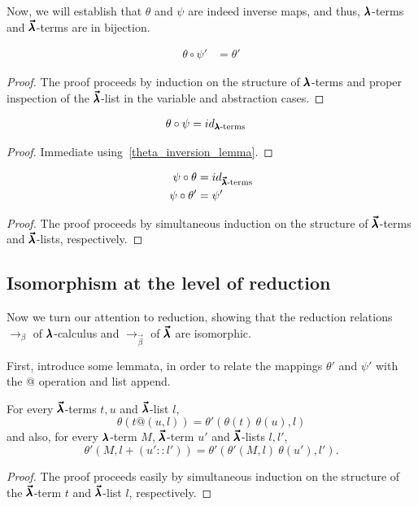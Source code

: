 Now, we will establish that $\theta$ and $\psi$ are indeed inverse maps, and thus, $\pmb{\lambda}$-terms and $\pmb{\vec \lambda}$-terms are in bijection.

\begin{lemma}
  \label{theta_inversion_lemma}
  \begin{align*}
    \theta \circ \psi' &= \theta'    
  \end{align*}
\end{lemma}
\begin{proof}
  The proof proceeds by induction on the structure of $\pmb{\lambda}$-terms and proper inspection of the $\pmb{\vec \lambda}$-list in the variable and abstraction cases.
\end{proof}


\begin{theorem}
  \label{theta_psi_inversion}
  \begin{align*}
    \theta \circ \psi &= id_{\pmb{\lambda} \text{-terms}}
  \end{align*}
\end{theorem}
\begin{proof}
  Immediate using~\cref{theta_inversion_lemma}.
\end{proof}


\begin{theorem}
  \label{psi_theta_inversion}
  \begin{align*}
    \psi \circ \theta &= id_{\pmb{\vec \lambda} \text{-terms}} \\
    \psi \circ \theta' &= \psi'    
  \end{align*}
\end{theorem}
\begin{proof}
  The proof proceeds by simultaneous induction on the structure of $\pmb{\vec \lambda}$-terms and $\pmb{\vec \lambda}$-lists, respectively.
\end{proof}


\subsection{Isomorphism at the level of reduction}

Now we turn our attention to reduction, showing that the reduction relations $\to_\beta$ of $\pmb{\lambda}$-calculus and $\to_{\vec \beta}$ of $\pmb{\vec \lambda}$ are isomorphic.

First, introduce some lemmata, in order to relate the mappings $\theta'$ and $\psi'$ with the @ operation and list append.

\begin{lemma}
  \label{theta_app_lemma}
  For every $\pmb{\vec \lambda}$-terms $t, u$ and $\pmb{\vec \lambda}$-list $l$,
  \[ \theta(t@(u, l)) = \theta'(\theta(t) \ \theta(u), l) \]
  and also, for every $\pmb{\lambda}$-term $M$, $\pmb{\vec \lambda}$-term $u'$ and $\pmb{\vec \lambda}$-lists $l, l'$,
  \[ \theta'(M, l+(u'::l')) = \theta'(\theta'(M, l) \ \theta(u'), l'). \]
\end{lemma}
\begin{proof}
  The proof proceeds easily by simultaneous induction on the structure of the $\pmb{\vec \lambda}$-term $t$ and $\pmb{\vec \lambda}$-list $l$, respectively.
\end{proof}

